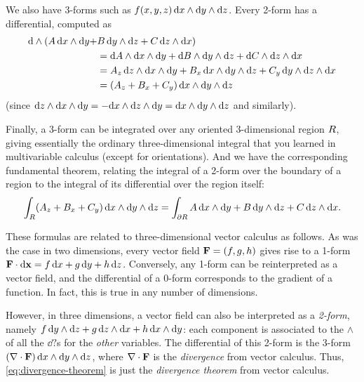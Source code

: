 \documentclass[12pt]{amsart}
\begin{document}
We also have 3-forms such as $f(x,y,z)\, \dx\wedge\dy\wedge\dz$.
Every 2-form has a differential, computed as
\begin{align*}
  \extd(A\,\dx\wedge\dy + & B\,\dy\wedge\dz + C \,\dz\wedge\dx)\\
  &= \dd A \wedge \dx \wedge \dy + \dd B \wedge \dy \wedge \dz + \dd C \wedge \dz \wedge \dx\\
  &= A_z\, \dz \wedge \dx \wedge \dy + B_x \,\dx \wedge \dy \wedge \dz + C_y \,\dy\wedge \dz \wedge \dx\\
  &= (A_z + B_x + C_y)\, \dx\wedge\dy\wedge \dz
\end{align*}
(since $\dz \wedge \dx \wedge \dy = -\dx \wedge \dz \wedge \dy = \dx \wedge \dy \wedge \dz$ and similarly).

Finally, a 3-form can be integrated over any oriented 3-dimensional region $\region$, giving essentially the ordinary three-dimensional integral that you learned in multivariable calculus (except for orientations).
And we have the corresponding fundamental theorem, relating the integral of a 2-form over the boundary of a region to the integral of its differential over the region itself:
\begin{equation}
  \int_{\region} (A_z + B_x + C_y)\, \dx\wedge\dy\wedge \dz = \int_{\bdry\region} A\,\dx\wedge\dy + B\,\dy\wedge\dz + C \,\dz\wedge\dx.\label{eq:divergence-theorem}
\end{equation}

These formulas are related to three-dimensional vector calculus as follows.
As was the case in two dimensions, every vector field $\vc{F}=\vcc{f,g,h}$ gives rise to a 1-form $\dotp{\vc{F}}{\dpx} = f\,\dx + g\,\dy + h\,\dz$.
Conversely, any 1-form can be reinterpreted as a vector field, and the differential of a 0-form corresponds to the gradient of a function.
In fact, this is true in any number of dimensions.

However, in three dimensions, a vector field can also be interpreted as a \emph{2-form}, namely $f\,\dy\wedge\dz + g \,\dz\wedge\dx + h \,\dx\wedge\dy$: each component is associated to the $\wedge$ of all the $\dd?$s for the \emph{other} variables.
The differential of this 2-form is the 3-form $(\div{\vc{F}})\,\dx\wedge\dy\wedge\dz$, where $\div{\vc{F}}$ is the \emph{divergence} from vector calculus.
Thus, \cref{eq:divergence-theorem} is just the \emph{divergence theorem} from vector calculus.
\end{document}
